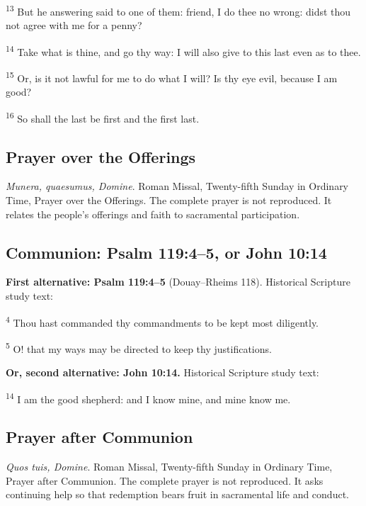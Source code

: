 \textsuperscript{13} But he answering said to one of them: friend, I do thee no wrong: didst thou not agree with me for a penny?

\textsuperscript{14} Take what is thine, and go thy way: I will also give to this last even as to thee.

\textsuperscript{15} Or, is it not lawful for me to do what I will? Is thy eye evil, because I am good?

\textsuperscript{16} So shall the last be first and the first last.

\subsection{Prayer over the Offerings}
\label{proper-offerings}
\textit{Munera, quaesumus, Domine}. Roman Missal, Twenty-fifth Sunday in Ordinary Time, Prayer over the Offerings. The complete prayer is not reproduced. It relates the people's offerings and faith to sacramental participation.

\subsection{Communion: Psalm 119:4--5, or John 10:14}
\label{proper-communion-ps119}
\textbf{First alternative: Psalm 119:4--5} (Douay--Rheims 118). Historical Scripture study text:

\textsuperscript{4} Thou hast commanded thy commandments to be kept most diligently.

\textsuperscript{5} O! that my ways may be directed to keep thy justifications.

\label{proper-communion-jn10}
\textbf{Or, second alternative: John 10:14.} Historical Scripture study text:

\textsuperscript{14} I am the good shepherd: and I know mine, and mine know me.

\subsection{Prayer after Communion}
\label{proper-after-communion}
\textit{Quos tuis, Domine}. Roman Missal, Twenty-fifth Sunday in Ordinary Time, Prayer after Communion. The complete prayer is not reproduced. It asks continuing help so that redemption bears fruit in sacramental life and conduct.
